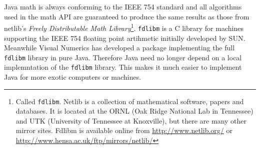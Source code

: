 Java math is always conforming to the IEEE 754 standard and all
algorithms used in the math API are guaranteed to produce the
same results as those from netlib's 
\emph{Freely Distributable Math Library}\footnote{Called \texttt{fdlibm}.
Netlib is a collection of mathematical software, papers and databases.
It is located at the ORNL (Oak Ridge National Lab in Tennessee) and UTK (University
of Tennessee at Knoxville), but there are many other mirror sites.
Fdlibm is available online from 
\href{http://www.netlib.org/}{http://www.netlib.org/} or
\href{http://www.hensa.ac.uk/ftp/mirrors/netlib/}%
           {http://www.hensa.ac.uk/ftp/mirrors/netlib/}}.
\verb|fdlibm| is a C library for machines supporting the IEEE 754 floating
point artihmetic initially developed by SUN. Meanwhile Visual Numerics has developed
a package implementing the full \verb|fdlibm| library in pure Java. Therefore
Java need no longer depend on a local implemntation of the 
\verb|fdlibm| library. This makes it much easier to implement Java for 
more exotic computers or machines. 

